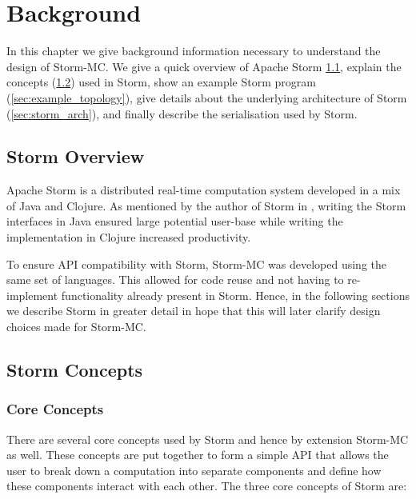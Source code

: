 \chapter{Background}

In this chapter we give background information necessary to understand the design of Storm-MC. We give a quick overview of Apache Storm \ref{sec:storm_overview}, explain the concepts (\ref{sec:concepts}) used in Storm, show an example Storm program (\ref{sec:example_topology}), give details about the underlying architecture of Storm (\ref{sec:storm_arch}), and finally  describe the serialisation used by Storm.

\section{Storm Overview}
\label{sec:storm_overview}

Apache Storm is a distributed real-time computation system developed in a mix of Java and Clojure. As mentioned by the author of Storm in \cite{Marz_2014}, writing the Storm interfaces in Java ensured large potential user-base while writing the implementation in Clojure increased productivity.

To ensure API compatibility with Storm, Storm-MC was developed using the same set of languages. This allowed for code reuse and not having to re-implement functionality already present in Storm. Hence, in the following sections we describe Storm in greater detail in hope that this will later clarify design choices made for Storm-MC.

\section{Storm Concepts}
\label{sec:concepts}

\subsection{Core Concepts}

There are several core concepts used by Storm and hence by extension Storm-MC as well. These concepts are put together to form a simple API that allows the user to break down a computation into separate components and define how these components interact with each other. The three core concepts of Storm are:

